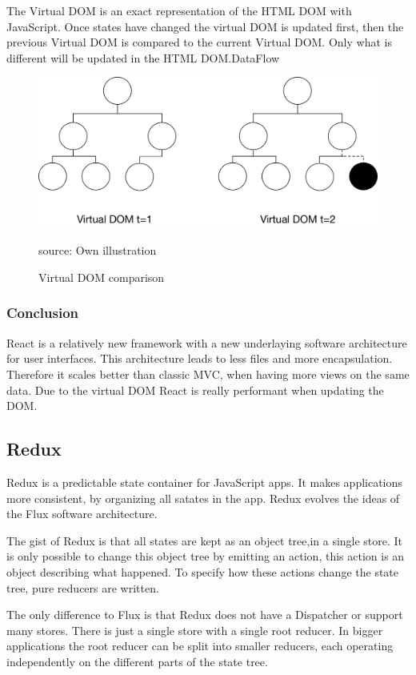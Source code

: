The Virtual DOM is an exact representation of the HTML DOM with JavaScript. Once states have changed the virtual DOM is updated first, then the previous Virtual DOM is compared to the current Virtual DOM. Only what is different will be updated in the HTML DOM.DataFlow

\begin{figure}[H]
	\centering
	\includegraphics[width=0.8\linewidth]{bilder/grundlagen/VirtualDom.png}
	\caption{Virtual DOM comparison} source: Own illustration
	\label{fig:VirtualDom}
\end{figure}


\subsubsection{Conclusion}
React is a relatively new framework with a new underlaying software architecture for user interfaces. This architecture leads to less files and more encapsulation. Therefore it scales better than classic MVC, when having more views on the same data. Due to the virtual DOM React is really performant when updating the DOM.


\subsection{Redux}
Redux is a predictable state container for JavaScript apps. It makes applications more consistent, by organizing all satates in the app. Redux evolves the ideas of the Flux software architecture.
 
The gist of Redux is that all states are kept as an object tree,in a single store. It is only possible to change this object tree by emitting an action, this action is an object describing what happened. To specify how these actions change the state tree, pure reducers are written.

The only difference to Flux is that Redux does not have a Dispatcher or support many stores. There is just a single store with a single root reducer. In bigger applications the root reducer can be split into smaller reducers, each operating independently on the different parts of the state tree.

